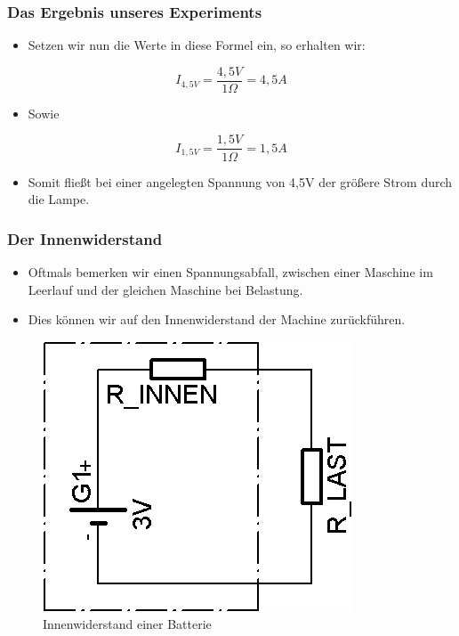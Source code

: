 \begin{frame}
	\frametitle{Das Ergebnis unseres Experiments}
	\begin{itemize}
		\item	Setzen wir nun die Werte in diese Formel ein, so erhalten wir:
	\end{itemize}
	\begin{equation}
		I_{4,5 V} = \frac{4,5 V}{1 \Omega} = 4,5 A
	\end{equation}
	\begin{itemize}
		\item Sowie
	\end{itemize}
	\begin{equation}
		I_{1,5 V} = \frac{1,5 V}{1 \Omega} = 1,5 A
	\end{equation}
	\begin{itemize}
		\item Somit fließt bei einer angelegten Spannung von 4,5V der größere Strom durch die Lampe.
	\end{itemize}
\end{frame}

\begin{frame}
	\frametitle{Der Innenwiderstand}
	\begin{itemize}
		\item	Oftmals bemerken wir einen Spannungsabfall, zwischen einer Maschine im Leerlauf und der gleichen Maschine bei Belastung.
		\item	Dies können wir auf den Innenwiderstand der Machine zurückführen.
	\end{itemize}
	\begin{center}
 		\begin{figure}
      			\includegraphics[scale=1.4]{e03/Innenwiderstand.png}
     			 \caption{Innenwiderstand einer Batterie}
   		 \end{figure}
 	\end{center}
\end{frame}


